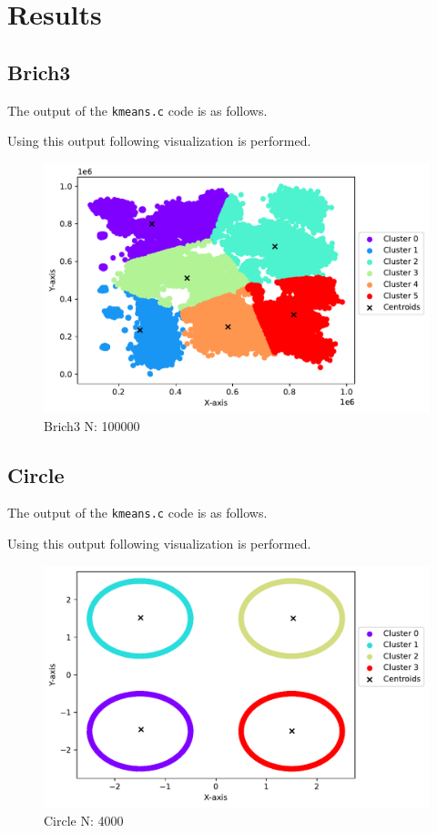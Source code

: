 \section{Results}

\subsection{Brich3}
The output of the \texttt{kmeans.c} code is as follows.


Using this output following visualization is performed.
\begin{figure}[H]
    \centering
    \includegraphics[width=.8\textwidth]{figures/plots/brich3.pdf}
    \caption{Brich3 N: 100000}
    \label{brich}
\end{figure}

\newpage
\subsection{Circle}
The output of the \texttt{kmeans.c} code is as follows.

Using this output following visualization is performed.

\begin{figure}[H]
    \centering
    \includegraphics[width=.8\textwidth]{figures/plots/circle.pdf}
    \caption{Circle N: 4000}
    \label{circle}
\end{figure}

